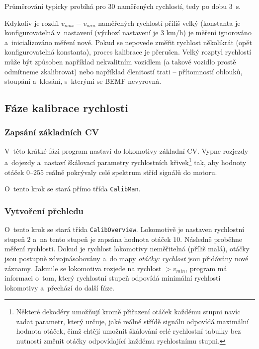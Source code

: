 Průměrování typicky probíhá pro $30$ naměřených rychlostí, tedy po dobu $3$~s.

Kdykoliv je rozdíl $v_{max} - v_{min}$ naměřených rychlostí příliš velký
(konstanta je konfigurovatelná v~nastavení (výchozí nastavení je 3 km/h) je
měření ignorováno a~inicializováno měření nové. Pokud se nepovede změřit
rychlost několikrát (opět konfigurovatelná konstanta), proces kalibrace je
přerušen. Velký rozptyl rychlostí může být způsoben například nekvalitním
vozidlem (a takové vozidlo prostě odmítneme zkalibrovat) nebo například
členitostí trati -- přítomností oblouků, stoupání a~klesání, s~kterými se BEMF
nevyrovná.

\subsection{Fáze kalibrace rychlosti}

\subsubsection{Zapsání základních CV}

V~této krátké fázi program nastaví do lokomotivy základní CV. Vypne rozjezdy
a~dojezdy a~nastaví škálovací parametry rychlostních křivek\footnote{Některé
dekodéry umožňují kromě přiřazení otáček každému stupni navíc zadat parametr,
který určuje, jaké reálné střídě signálu odpovídá maximální hodnota otáček,
čímž chtějí umožnit škálování celé rychlostní tabulky bez nutnosti změnit otáčky
odpovídající každému rychlostnímu stupni.} tak, aby hodnoty otáček $0$--$255$
reálně pokrývaly celé spektrum stříd signálů do motoru.

O~tento krok se stará přímo třída \texttt{CalibMan}.

\subsubsection{Vytvoření přehledu}

O~tento krok se stará třída \texttt{CalibOverview}.
Lokomotivě je nastaven rychlostní stupeň $2$ a~na tento stupeň je zapsána hodnota otáček
$10$. Následně proběhne měření rychlosti. Dokud je rychlost lokomotivy
neměřitelná (příliš malá), otáčky jsou postupně zdvojnásobovány a~do mapy
\textit{otáčky: rychlost} jsou přidávány nové záznamy. Jakmile se lokomotiva
rozjede na rychlost $> v_{min}$, program má informaci o~tom, který rychlostní
stupeň odpovídá minimální rychlosti lokomotivy a~přechází do další fáze.

